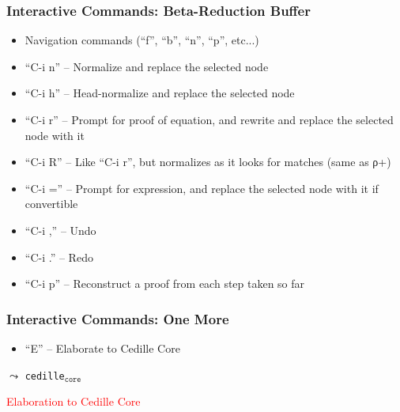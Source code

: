 \documentclass[11pt]{beamer}
\begin{document}
\begin{frame}
\frametitle{Interactive Commands: Beta-Reduction Buffer}
\begin{itemize}
\item Navigation commands (``f'', ``b'', ``n'', ``p'', etc...)
\pause
\item ``C-i n'' -- Normalize and replace the selected node
\item ``C-i h'' -- Head-normalize and replace the selected node
\pause
\item ``C-i r'' -- Prompt for proof of equation, and rewrite and replace the selected node with it
\item ``C-i R'' -- Like ``C-i r'', but normalizes as it looks for matches (same as ρ+)
\pause
\item ``C-i ='' -- Prompt for expression, and replace the selected node with it if convertible
\pause
\item ``C-i ,'' -- Undo
\item ``C-i .'' -- Redo
\pause
\item ``C-i p'' -- Reconstruct a proof from each step taken so far
\end{itemize}

\end{frame}



\begin{frame}

\frametitle{Interactive Commands: One More}
\begin{itemize}
\item ``E'' -- Elaborate to Cedille Core
\end{itemize}
\end{frame}

\begin{frame}

\begin{center}

{\Huge $\leadsto$ \texttt{cedille}$_{\texttt{core}}$}

\vspace{1cm}

{\Large \textcolor{red}{Elaboration to Cedille Core}}

\end{center}

\end{frame}
\end{document}
